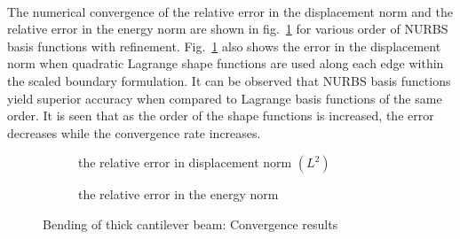 \paragraph{}
The numerical convergence of the relative error in the displacement norm and the relative error in the energy norm are
    shown in fig.~\ref{fig:cantilever_beam_convergence} for various order of NURBS basis functions with refinement.
Fig.~\ref{fig:cantilever_beam_convergence} also shows the error in the displacement norm when quadratic Lagrange shape
    functions are used along each edge within the scaled boundary formulation.
It can be observed that NURBS basis functions yield superior accuracy when compared to Lagrange basis functions of the
    same order.
It is seen that as the order of the shape functions is increased, the error decreases while the convergence rate increases.

\begin{figure}
    \begin{subfigure}[b]{1\linewidth}
        \centering
        \scalebox{0.7}{
            
        }
        \caption{the relative error in displacement norm $(L^2)$}
    \end{subfigure}
    
    \begin{subfigure}[b]{1\linewidth}
        \centering
        \scalebox{0.7}{
            
        }
        \caption{the relative error in the energy norm}
    \end{subfigure}
\label{fig:cantilever_beam_convergence}
\caption{Bending of thick cantilever beam: Convergence results}
\end{figure}